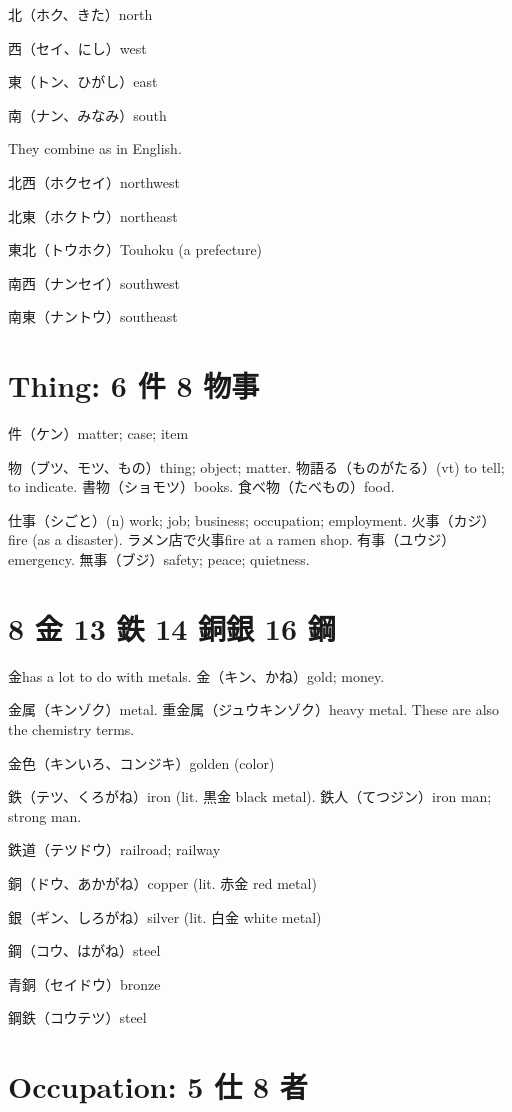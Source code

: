 北（ホク、きた）north

西（セイ、にし）west

東（トン、ひがし）east

南（ナン、みなみ）south

They combine as in English.

北西（ホクセイ）northwest

北東（ホクトウ）northeast

東北（トウホク）Touhoku (a prefecture)

南西（ナンセイ）southwest

南東（ナントウ）southeast

\section{Thing: 6 件 8 物事}

件（ケン）matter; case; item

物（ブツ、モツ、もの）thing; object; matter.
物語る（ものがたる）(vt) to tell; to indicate.
書物（ショモツ）books.
食べ物（たべもの）food.

仕事（シごと）(n) work; job; business; occupation; employment.
火事（カジ）fire (as a disaster).
ラメン店で火事fire at a ramen shop.
有事（ユウジ）emergency.
無事（ブジ）safety; peace; quietness.

\section{8 金 13 鉄 14 銅銀 16 鋼}

金has a lot to do with metals.
金（キン、かね）gold; money.

金属（キンゾク）metal.
重金属（ジュウキンゾク）heavy metal.
These are also the chemistry terms.

金色（キンいろ、コンジキ）golden (color)

鉄（テツ、くろがね）iron (lit. 黒金 black metal).
鉄人（てつジン）iron man; strong man.

鉄道（テツドウ）railroad; railway

銅（ドウ、あかがね）copper (lit. 赤金 red metal)

銀（ギン、しろがね）silver (lit. 白金 white metal)

鋼（コウ、はがね）steel

青銅（セイドウ）bronze

鋼鉄（コウテツ）steel

\section{Occupation: 5 仕 8 者}

